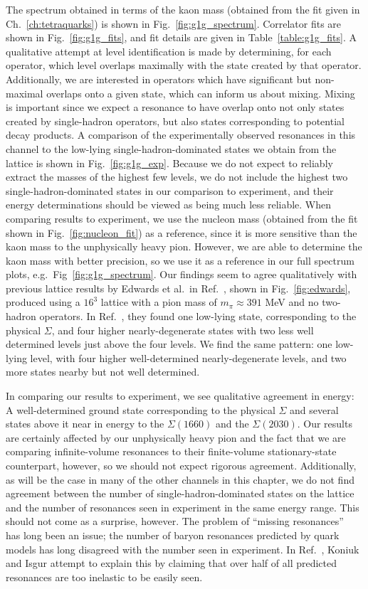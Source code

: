 The spectrum obtained in terms of the kaon mass (obtained from the fit given in Ch.~\ref{ch:tetraquarks}) is shown in Fig.~\ref{fig:g1g_spectrum}. Correlator fits are shown in Fig.~\ref{fig:g1g_fits}, and fit details are given in Table~\ref{table:g1g_fits}. A qualitative attempt at level identification is made by determining, for each operator, which level overlaps maximally with the state created by that operator. Additionally, we are interested in operators which have significant but non-maximal overlaps onto a given state, which can inform us about mixing. Mixing is important since we expect a resonance to have overlap onto not only states created by single-hadron operators, but also states corresponding to potential decay products. A comparison of the experimentally observed resonances in this channel to the low-lying single-hadron-dominated states we obtain from the lattice is shown in Fig.~\ref{fig:g1g_exp}. Because we do not expect to reliably extract the masses of the highest few levels, we do not include the highest two single-hadron-dominated states in our comparison to experiment, and their energy determinations should be viewed as being much less reliable. When comparing results to experiment, we use the nucleon mass (obtained from the fit shown in Fig.~\ref{fig:nucleon_fit}) as a reference, since it is more sensitive than the kaon mass to the unphysically heavy pion. However, we are able to determine the kaon mass with better precision, so we use it as a reference in our full spectrum plots, e.g.\ Fig~\ref{fig:g1g_spectrum}. Our findings seem to agree qualitatively with previous lattice results by Edwards et al.\ in Ref.~\cite{Edwards:2012fx}, shown in Fig.~\ref{fig:edwards}, produced using a $16^3$ lattice with a pion mass of $m_\pi \approx 391$ MeV and no two-hadron operators. In Ref.~\cite{Edwards:2012fx}, they found one low-lying state, corresponding to the physical $\Sigma$, and four higher nearly-degenerate states with two less well determined levels just above the four levels. We find the same pattern: one low-lying level, with four higher well-determined nearly-degenerate levels, and two more states nearby but not well determined.

In comparing our results to experiment, we see qualitative agreement in energy: A well-determined ground state corresponding to the physical $\Sigma$ and several states above it near in energy to the $\Sigma(1660)$ and the $\Sigma(2030)$. Our results are certainly affected by our unphysically heavy pion and the fact that we are comparing infinite-volume resonances to their finite-volume stationary-state counterpart, however, so we should not expect rigorous agreement. Additionally, as will be the case in many of the other channels in this chapter, we do not find agreement between the number of single-hadron-dominated states on the lattice and the number of resonances seen in experiment in the same energy range. This should not come as a surprise, however. The problem of ``missing resonances''~\cite{Koniuk:1979vw} has long been an issue; the number of baryon resonances predicted by quark models has long disagreed with the number seen in experiment. In Ref.~\cite{Koniuk:1979vw}, Koniuk and Isgur attempt to explain this by claiming that over half of all predicted resonances are too inelastic to be easily seen.

